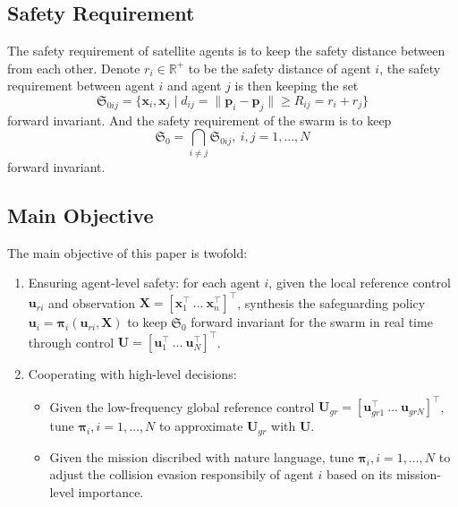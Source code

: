 \documentclass{ifacconf}
\begin{document}
\subsection{Safety Requirement}
\par The safety requirement of satellite agents is to keep the safety distance between from each other. 
Denote $r_i \in \mathbb{R}^+$ to be the safety distance of agent $i$, the safety requirement between agent $i$ and agent $j$ is then keeping the set
\begin{equation}
   \mathfrak{S}_{0ij} = \{\boldsymbol{x}_i, \boldsymbol{x}_j \mid d_{ij} = \| \boldsymbol{p}_i - \boldsymbol{p}_j \| \ge R_{ij} = r_i + r_j \}
\end{equation}
forward invariant. 
And the safety requirement of the swarm is to keep 
\begin{equation}
   \mathfrak{S}_0 = \bigcap_{i \neq j}\mathfrak{S}_{0ij}, ~i,j = 1, \dots, N
\end{equation}
forward invariant.

\subsection{Main Objective}
\par The main objective of this paper is twofold:
\begin{enumerate}[label=\arabic*)]
   \item Ensuring agent-level safety: for each agent $i$, given the local reference control $\boldsymbol{u}_{ri}$ and observation $\boldsymbol{X} = [\boldsymbol{x}_1^{\top}~\dots~\boldsymbol{x}_n^{\top}]^{\top}$, synthesis the safeguarding policy $\boldsymbol{u}_i = \boldsymbol{\pi}_{i}(\boldsymbol{u}_{ri}, \boldsymbol{X})$ to keep $\mathfrak{S}_0$ forward invariant for the swarm in real time through control $\boldsymbol{U} = [\boldsymbol{u}_1^\top~\dots~\boldsymbol{u}_N^\top]^\top$.
   \item Cooperating with high-level decisions: 
      \begin{itemize}
         \item Given the low-frequency global reference control $\boldsymbol{U}_{gr} = [\boldsymbol{u}_{gr1}^{\top}~\dots~\boldsymbol{u}_{grN}]^\top$, tune $\boldsymbol{\pi}_i, i = 1, \dots, N$ to approximate $\boldsymbol{U}_{gr}$ with $\boldsymbol{U}$.
         \item Given the mission discribed with nature language, tune $\boldsymbol{\pi}_i, i = 1, \dots, N$ to adjust the collision evasion responsibily of agent $i$ based on its mission-level importance. 
      \end{itemize}
\end{enumerate}
\end{document}
